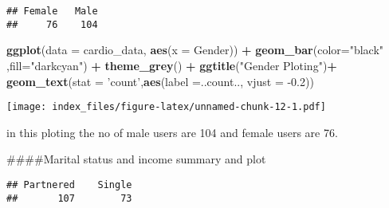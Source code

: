 \documentclass[
]{article}
\newenvironment{Shaded}{\begin{snugshade}}{\end{snugshade}}
\newcommand{\CommentTok}[1]{\textcolor[rgb]{0.56,0.35,0.01}{\textit{#1}}}
\newcommand{\DataTypeTok}[1]{\textcolor[rgb]{0.13,0.29,0.53}{#1}}
\newcommand{\FloatTok}[1]{\textcolor[rgb]{0.00,0.00,0.81}{#1}}
\newcommand{\KeywordTok}[1]{\textcolor[rgb]{0.13,0.29,0.53}{\textbf{#1}}}
\newcommand{\NormalTok}[1]{#1}
\newcommand{\OperatorTok}[1]{\textcolor[rgb]{0.81,0.36,0.00}{\textbf{#1}}}
\newcommand{\StringTok}[1]{\textcolor[rgb]{0.31,0.60,0.02}{#1}}
\begin{document}
\begin{verbatim}
## Female   Male 
##     76    104
\end{verbatim}

\begin{Shaded}
\begin{Highlighting}[]
\KeywordTok{ggplot}\NormalTok{(}\DataTypeTok{data =}\NormalTok{ cardio_data, }\KeywordTok{aes}\NormalTok{(}\DataTypeTok{x =}\NormalTok{ Gender)) }\OperatorTok{+}\StringTok{ }
\StringTok{  }\KeywordTok{geom_bar}\NormalTok{(}\DataTypeTok{color=}\StringTok{"black"}\NormalTok{ ,}\DataTypeTok{fill=}\StringTok{"darkcyan"}\NormalTok{) }\OperatorTok{+}
\StringTok{  }\KeywordTok{theme_grey}\NormalTok{() }\OperatorTok{+}\StringTok{ }\KeywordTok{ggtitle}\NormalTok{(}\StringTok{"Gender Ploting"}\NormalTok{)}\OperatorTok{+}
\StringTok{  }\KeywordTok{geom_text}\NormalTok{(}\DataTypeTok{stat =} \StringTok{'count'}\NormalTok{,}\KeywordTok{aes}\NormalTok{(}\DataTypeTok{label =}\NormalTok{..count.., }\DataTypeTok{vjust =} \FloatTok{-0.2}\NormalTok{))}
\end{Highlighting}
\end{Shaded}

\texttt{[image: index\_files/figure-latex/unnamed-chunk-12-1.pdf]}

in this ploting the no of male users are 104 and female users are 76.

\#\#\#\#Marital status and income summary and plot

\begin{Shaded}
\end{Shaded}

\begin{verbatim}
## Partnered    Single 
##       107        73
\end{verbatim}

\begin{Shaded}
\end{Shaded}
\end{document}
